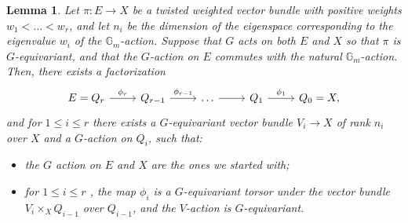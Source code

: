 \documentclass[12pt]{amsart}
\newcommand\Gm{\mathbb{G}_m}
\newtheorem{Lemma}[theorem]{Lemma}
\theoremstyle{definition}
\begin{document}
\begin{Lemma}\label{lem: factorization of twisted weighted vector bundles}
    Let $\pi:E\rightarrow X$ be a twisted weighted vector bundle with positive weights $w_1<\ldots<w_r$, and let $n_i$ be the dimension of the eigenspace corresponding to the eigenvalue $w_i$ of the $\Gm$-action. Suppose that $G$ acts on both $E$ and $X$ so that $\pi$ is $G$-equivariant, and that the $G$-action on $E$ commutes with the natural $\Gm$-action. Then, there exists a factorization
    \begin{equation}\label{eq: factorization of twisted weighted vector bundles}
        \begin{tikzcd}
            E=Q_r\arrow[r,"\phi_r"] & Q_{r-1}\arrow[r,"\phi_{r-1}"] & \ldots \arrow[r] & Q_1\arrow[r,"\phi_1"] & Q_0=X,
        \end{tikzcd}
    \end{equation}
    and for $1\leq i\leq r$ there exists a $G$-equivariant vector bundle $V_i\rightarrow X$ of rank $n_i$ over $X$ and a $G$-action on $Q_i$, such that:
    \begin{itemize}
        \item the $G$ action on $E$ and $X$ are the ones we started with;
        \item for $1\leq i\leq r$ , the map $\phi_{i}$ is a $G$-equivariant torsor under the vector bundle $V_i\times_{X}Q_{i-1}$ over $Q_{i-1}$, and the $V$-action is $G$-equivariant.
    \end{itemize}
\end{Lemma}
\end{document}
